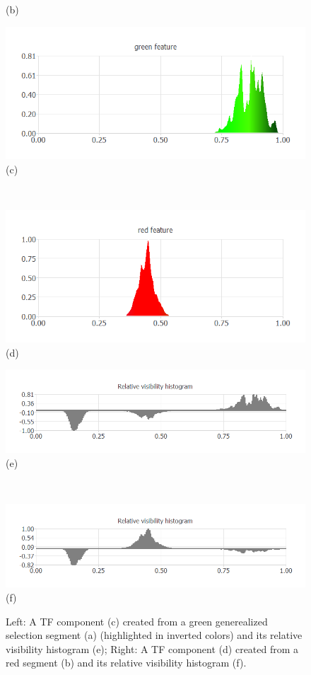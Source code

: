 \documentclass[twoside,twocolumn,10pt]{article}
\begin{document}
\begin{figure}
\begin{minipage}{.16\textwidth}
(b)
	\end{minipage}
	\begin{minipage}{.16\textwidth}
		\centering
		\includegraphics[width=1\linewidth]{nucleon_green_segment}
(c)
	\end{minipage}~
	\begin{minipage}{.16\textwidth}
		\centering
		\includegraphics[width=1\linewidth]{nucleon_red_segment}
(d)
	\end{minipage}
	\begin{minipage}{.16\textwidth}
		\centering
		\includegraphics[width=1\linewidth]{nucleon_green_segment_Relative_visibility_histogram}
(e)
	\end{minipage}~
	\begin{minipage}{.16\textwidth}
		\centering
		\includegraphics[width=1\linewidth]{nucleon_red_segment_Relative_visibility_histogram}
(f)
	\end{minipage}
	\caption{Left: A TF component (c) created from a green generealized selection segment (a) (highlighted in inverted colors) and its relative visibility histogram (e); Right: A TF component (d) created from a red segment (b) and its relative visibility histogram (f).}
	\label{fig:nucleon_segments}
\end{figure}
\end{document}
